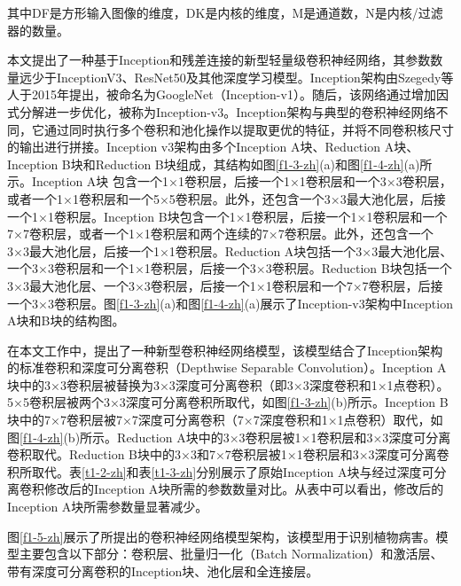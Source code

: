 其中DF是方形输入图像的维度，DK是内核的维度，M是通道数，N是内核/过滤器的数量。


本文提出了一种基于Inception和残差连接的新型轻量级卷积神经网络，其参数数量远少于InceptionV3、ResNet50及其他深度学习模型。Inception架构由Szegedy等人于2015年提出，被命名为GoogleNet（Inception-v1）。随后，该网络通过增加因式分解进一步优化，被称为Inception-v3。Inception架构与典型的卷积神经网络不同，它通过同时执行多个卷积和池化操作以提取更优的特征，并将不同卷积核尺寸的输出进行拼接。Inception v3架构由多个Inception A块、Reduction A块、Inception B块和Reduction B块组成，其结构如图\ref{f1-3-zh}(a)和图\ref{f1-4-zh}(a)所示。Inception A块 包含一个1×1卷积层，后接一个1×1卷积层和一个3×3卷积层，或者一个1×1卷积层和一个5×5卷积层。此外，还包含一个3×3最大池化层，后接一个1×1卷积层。Inception B块包含一个1×1卷积层，后接一个1×1卷积层和一个7×7卷积层，或者一个1×1卷积层和两个连续的7×7卷积层。此外，还包含一个3×3最大池化层，后接一个1×1卷积层。Reduction A块包括一个3×3最大池化层、一个3×3卷积层和一个1×1卷积层，后接一个3×3卷积层。Reduction B块包括一个3×3最大池化层、一个3×3卷积层，后接一个1×1卷积层和一个7×7卷积层，后接一个3×3卷积层。图\ref{f1-3-zh}(a)和图\ref{f1-4-zh}(a)展示了Inception-v3架构中Inception A块和B块的结构图。



在本文工作中，提出了一种新型卷积神经网络模型，该模型结合了Inception架构的标准卷积和深度可分离卷积（Depthwise Separable Convolution）。Inception A块中的3×3卷积层被替换为3×3深度可分离卷积（即3×3深度卷积和1×1点卷积）。5×5卷积层被两个3×3深度可分离卷积所取代，如图\ref{f1-3-zh}(b)所示。Inception B块中的7×7卷积层被7×7深度可分离卷积（7×7深度卷积和1×1点卷积）取代，如图\ref{f1-4-zh}(b)所示。Reduction A块中的3×3卷积层被1×1卷积层和3×3深度可分离卷积取代。Reduction B块中的3×3和7×7卷积层被1×1卷积层和3×3深度可分离卷积所取代。表\ref{t1-2-zh}和表\ref{t1-3-zh}分别展示了原始Inception A块与经过深度可分离卷积修改后的Inception A块所需的参数数量对比。从表中可以看出，修改后的Inception A块所需参数量显著减少。



图\ref{f1-5-zh}展示了所提出的卷积神经网络模型架构，该模型用于识别植物病害。模型主要包含以下部分：卷积层、批量归一化（Batch Normalization）和激活层、带有深度可分离卷积的Inception块、池化层和全连接层。

